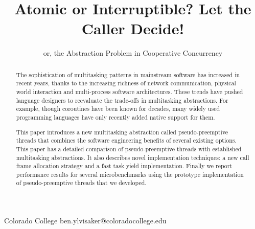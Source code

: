 \documentclass[9pt,preprint]{sigplanconf}
\begin{document}
\newcommand{\charcoal}{Charcoal}
\newcommand{\noyield}{\texttt{no\_yield}}

\setlength{\pdfpageheight}{\paperheight}
\setlength{\pdfpagewidth}{\paperwidth}



\title{Atomic or Interruptible?
Let the Caller Decide!}
\subtitle{or, the Abstraction Problem in Cooperative Concurrency}

           {Colorado College}
           {ben.ylvisaker@coloradocollege.edu}

\maketitle

\begin{abstract}

The sophistication of multitasking patterns in mainstream software has increased in recent years, thanks to the increasing richness of network communication, physical world interaction and multi-process software architectures.
These trends have pushed language designers to reevaluate the trade-offs in multitasking abstractions.
For example, though coroutines have been known for decades, many widely used programming languages have only recently added native support for them.

This paper introduces a new multitasking abstraction called pseudo-preemptive threads that combines the software engineering benefits of several existing options.
This paper has a detailed comparison of pseudo-preemptive threads with established multitasking abstractions.
It also describes novel implementation techniques: a new call frame allocation strategy and a fast task yield implementation.
Finally we report performance results for several microbenchmarks using the prototype implementation of pseudo-preemptive threads that we developed.

\end{abstract}
\end{document}
